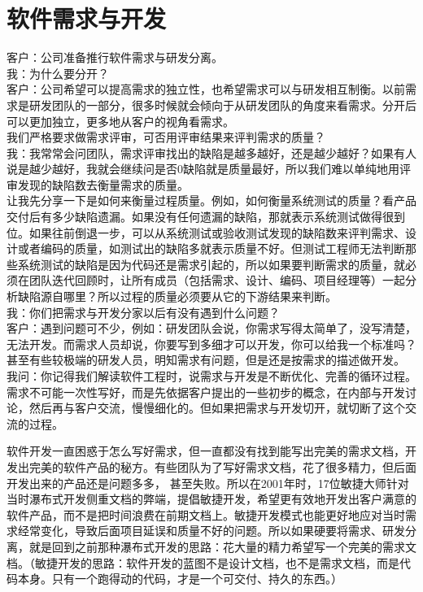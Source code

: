 \chapter{软件需求与开发} %

客户：公司准备推行软件需求与研发分离。\\
我：为什么要分开？\\
客户：公司希望可以提高需求的独立性，也希望需求可以与研发相互制衡。以前需求是研发团队的一部分，很多时候就会倾向于从研发团队的角度来看需求。分开后可以更加独立，更多地从客户的视角看需求。\\
我们严格要求做需求评审，可否用评审结果来评判需求的质量？\\
我：我常常会问团队，需求评审找出的缺陷是越多越好，还是越少越好？如果有人说是越少越好，我就会继续问是否0缺陷就是质量最好，所以我们难以单纯地用评审发现的缺陷数去衡量需求的质量。\\
让我先分享一下是如何来衡量过程质量。例如，如何衡量系统测试的质量？看产品交付后有多少缺陷遗漏。如果没有任何遗漏的缺陷，那就表示系统测试做得很到位。如果往前倒退一步，可以从系统测试或验收测试发现的缺陷数来评判需求、设计或者编码的质量，如测试出的缺陷多就表示质量不好。但测试工程师无法判断那些系统测试的缺陷是因为代码还是需求引起的，所以如果要判断需求的质量，就必须在团队迭代回顾时，让所有成员（包括需求、设计、编码、项目经理等）一起分析缺陷源自哪里？所以过程的质量必须要从它的下游结果来判断。\\
我：你们把需求与开发分家以后有没有遇到什么问题？\\
客户：遇到问题可不少，例如：研发团队会说，你需求写得太简单了，没写清楚，无法开发。而需求人员却说，你要写到多细才可以开发，你可以给我一个标准吗？甚至有些较极端的研发人员，明知需求有问题，但是还是按需求的描述做开发。\\
我问：你记得我们解读软件工程时，说需求与开发是不断优化、完善的循环过程。需求不可能一次性写好，而是先依据客户提出的一些初步的概念，在内部与开发讨论，然后再与客户交流，慢慢细化的。但如果把需求与开发切开，就切断了这个交流的过程。

软件开发一直困惑于怎么写好需求，但一直都没有找到能写出完美的需求文档，开发出完美的软件产品的秘方。有些团队为了写好需求文档，花了很多精力，但后面开发出来的产品还是问题多多，
甚至失败。所以在2001年时，17位敏捷大师针对当时瀑布式开发侧重文档的弊端，提倡敏捷开发，希望更有效地开发出客户满意的软件产品，而不是把时间浪费在前期文档上。敏捷开发模式也能更好地应对当时需求经常变化，导致后面项目延误和质量不好的问题。所以如果硬要将需求、研发分离，就是回到之前那种瀑布式开发的思路：花大量的精力希望写一个完美的需求文档。（敏捷开发的思路：软件开发的蓝图不是设计文档，也不是需求文档，而是代码本身。只有一个跑得动的代码，才是一个可交付、持久的东西。）

